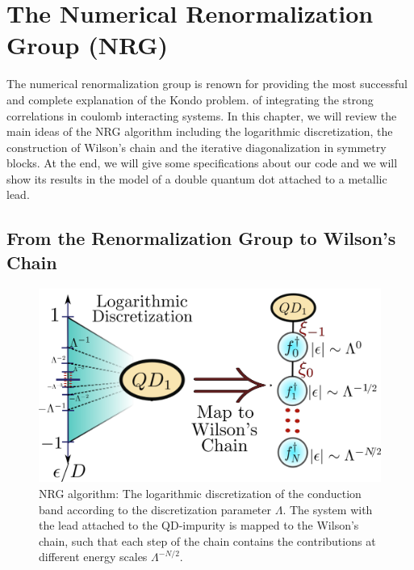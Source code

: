 


\section{The Numerical Renormalization Group\label{sec:The-Numerical-Renormaliztion} (NRG) }

The numerical renormalization group is renown for providing the most successful and complete explanation of the Kondo problem. of integrating the strong correlations in coulomb interacting systems. In this chapter, we will review the main ideas of the NRG algorithm including the logarithmic discretization, the construction of Wilson's chain and the iterative diagonalization in symmetry blocks. At the end, we will give some specifications about our code and we will show its results in the model of a double quantum dot attached to a metallic lead. 

\subsection{From the Renormalization Group to  Wilson's Chain \label{subsec:Logarithmic}}

\begin{figure}[hbt]
\centering
\includegraphics[scale=0.45]{IMAGES/DQD/NRG-Final.png}\caption{\label{fig:Discretization}
NRG algorithm: The logarithmic discretization of the conduction band according to the discretization parameter $\Lambda$. The system with the lead attached to the QD-impurity is mapped to the Wilson's chain, such that each step of the chain contains the contributions at different energy scales $\Lambda^{-N/2}$. \protect\Source{   } }
\end{figure}

